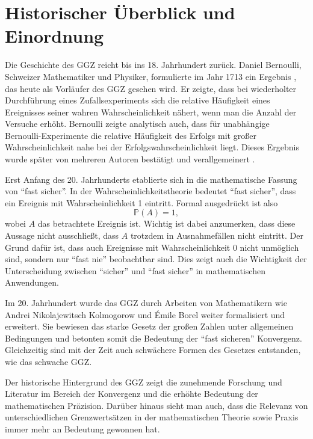 \documentclass[12pt,a4paper]{article}
\begin{document}
\section{Historischer Überblick und Einordnung}
\label{sec:hist}
Die Geschichte des GGZ reicht bis ins 18. Jahrhundert zurück.
Daniel Bernoulli, Schweizer Mathematiker und Physiker, formulierte im Jahr 1713 ein Ergebnis \citep{bernoulli1713}, das heute als Vorläufer des GGZ gesehen wird.
Er zeigte, dass bei wiederholter Durchführung eines Zufallsexperiments sich die relative Häufigkeit eines Ereignisses seiner wahren Wahrscheinlichkeit nähert, wenn man die Anzahl der Versuche erhöht.
Bernoulli zeigte analytisch auch, dass für unabhängige Bernoulli-Experimente die relative Häufigkeit des Erfolgs mit großer Wahrscheinlichkeit nahe bei der Erfolgswahrscheinlichkeit liegt.
Dieses Ergebnis wurde später von mehreren Autoren bestätigt und verallgemeinert \citet{poisson1837theorie, chebyshev1867}.


Erst Anfang des 20. Jahrhunderts etablierte sich in \citep{borel1909probabilites} die mathematische Fassung von \enquote{fast sicher}.
In der Wahrscheinlichkeitstheorie bedeutet \enquote{fast sicher}, dass ein Ereignis mit Wahrscheinlichkeit 1 eintritt.
Formal ausgedrückt ist also
\[\mathbb{P}(A) = 1,\]
wobei \( A \) das betrachtete Ereignis ist. Wichtig ist dabei anzumerken, dass diese Aussage nicht ausschließt, dass \( A \) trotzdem in Ausnahmefällen nicht eintritt. Der Grund dafür ist, dass auch Ereignisse mit Wahrscheinlichkeit 0 nicht unmöglich sind, sondern nur \enquote{fast nie} beobachtbar sind.
Dies zeigt auch die Wichtigkeit der Unterscheidung zwischen \enquote{sicher} und \enquote{fast sicher} in mathematischen Anwendungen.


Im 20. Jahrhundert wurde das GGZ durch Arbeiten von Mathematikern wie  Andrei Nikolajewitsch Kolmogorow und Émile Borel weiter formalisiert und erweitert.
Sie bewiesen das starke Gesetz der großen Zahlen unter allgemeinen Bedingungen und betonten somit die Bedeutung der \enquote{fast sicheren} Konvergenz.
Gleichzeitig sind mit der Zeit auch schwächere Formen des Gesetzes entstanden, wie das schwache GGZ.


Der historische Hintergrund des GGZ zeigt die zunehmende Forschung und Literatur im Bereich der Konvergenz und die erhöhte Bedeutung der mathematischen Präzision. Darüber hinaus sieht man auch, dass die Relevanz von unterschiedlichen Grenzwertsätzen in der mathematischen Theorie sowie Praxis immer mehr an Bedeutung gewonnen hat.
\end{document}
